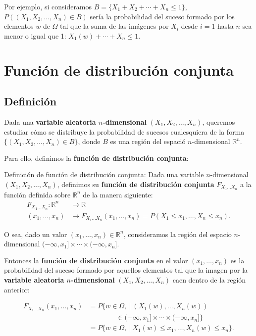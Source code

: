\documentclass[]{book}
\begin{document}
Por ejemplo, si consideramos \(B=\{X_1+X_2+\cdots +X_n\leq 1\}\), \(P((X_1,X_2,\ldots,X_n)\in B)\) sería la probabilidad del suceso formado por los elementos \(w\) de \(\Omega\) tal que la suma de las imágenes por \(X_i\) desde \(i=1\) hasta \(n\) sea menor o igual que 1: \(X_1(w)+\cdots +X_n\leq 1\).

\hypertarget{funciuxf3n-de-distribuciuxf3n-conjunta-1}{%
\section{Función de distribución conjunta}\label{funciuxf3n-de-distribuciuxf3n-conjunta-1}}

\hypertarget{definiciuxf3n-4}{%
\subsection{Definición}\label{definiciuxf3n-4}}

Dada una \textbf{variable aleatoria \(n\)-dimensional} \((X_1,X_2,\ldots,X_n)\), queremos estudiar cómo se distribuye la probabilidad de sucesos cualesquiera de la forma \(\{(X_1,X_2,\ldots,X_n)\in B\}\), donde \(B\) es una región del espació \(n\)-dimensional \(\mathbb{R}^n\).

Para ello, definimos la \textbf{función de distribución conjunta}:

Definición de función de distribución conjunta:
Dada una variable \(n\)-dimensional \((X_1,X_2,\ldots,X_n)\), definimos su \textbf{función de distribución conjunta} \(F_{X_1\ldots X_n}\) a la función definida sobre \(\mathbb{R}^n\) de la manera siguiente:
\[
\begin{array}{rl}
F_{X_1\ldots X_n}: \mathbb{R}^n & \longrightarrow \mathbb{R}\\
(x_1,\ldots,x_n) & \longrightarrow F_{X_1\ldots X_n}(x_1,\ldots,x_n)=P(X_1\leq x_1,\ldots,X_n\leq x_n).
\end{array}
\]

O sea, dado un valor \((x_1,\ldots,x_n)\in \mathbb{R}^n\), consideramos la región del espacio \(n\)-dimensional \((-\infty,x_1]\times\cdots\times (-\infty,x_n]\).

Entonces la \textbf{función de distribución conjunta} en el valor \((x_1,\ldots,x_n)\) es la probabilidad del suceso formado por aquellos elementos tal que la imagen por la \textbf{variable aleatoria \(n\)-dimensional} \((X_1,X_2,\ldots,X_n)\) caen dentro de la región anterior:

\[
\begin{array}{rl}
F_{X_1\ldots X_n}(x_1,\ldots,x_n) & =P\{w\in\Omega,\ |\ (X_1(w),\ldots,X_n(w)) \\ & \qquad\qquad\in (-\infty,x_1]\times\cdots\times (-\infty,x_n]\} \\ & = P\{w\in\Omega,\ |\ X_1(w)\leq x_1,\ldots, X_n(w)\leq x_n\}.
\end{array}
\]
\end{document}
